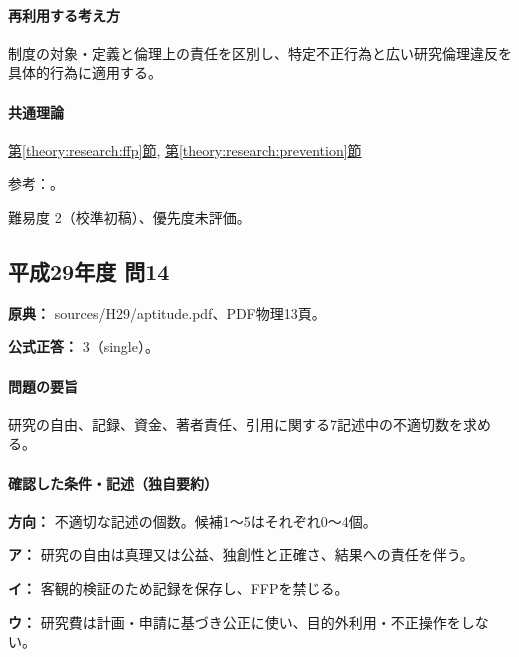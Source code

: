 \paragraph{再利用する考え方} 制度の対象・定義と倫理上の責任を区別し、特定不正行為と広い研究倫理違反を具体的行為に適用する。

\paragraph{共通理論} \hyperref[theory:research:ffp]{第\ref*{theory:research:ffp}節}, \hyperref[theory:research:prevention]{第\ref*{theory:research:prevention}節}

\par 参考：\cite{mext_misconduct2014}。

\par 難易度 2（校準初稿）、優先度未評価。

\subsection{平成29年度 問14}
\label{q:h29-reg-apt-14}

\noindent\textbf{原典：} sources/H29/aptitude.pdf、PDF物理13頁。

\textbf{公式正答：} 3（single）。

\paragraph{問題の要旨} 研究の自由、記録、資金、著者責任、引用に関する7記述中の不適切数を求める。

\paragraph{確認した条件・記述（独自要約）}\mbox{}\par

\noindent\textbf{方向：} 不適切な記述の個数。候補1〜5はそれぞれ0〜4個。\par

\noindent\textbf{ア：} 研究の自由は真理又は公益、独創性と正確さ、結果への責任を伴う。\par

\noindent\textbf{イ：} 客観的検証のため記録を保存し、FFPを禁じる。\par

\noindent\textbf{ウ：} 研究費は計画・申請に基づき公正に使い、目的外利用・不正操作をしない。\par

